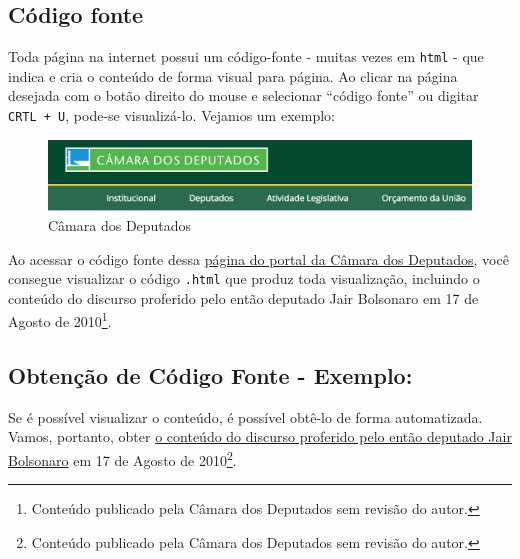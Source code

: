 \documentclass[]{book}
\begin{document}
\hypertarget{cuxf3digo-fonte}{%
\subsection{Código fonte}\label{cuxf3digo-fonte}}

Toda página na internet possui um código-fonte - muitas vezes em \texttt{html} - que indica
e cria o conteúdo de forma visual para página. Ao clicar na página desejada com o
botão direito do mouse e selecionar ``código fonte'' ou digitar \texttt{CRTL\ +\ U}, pode-se
visualizá-lo. Vejamos um exemplo:

\begin{figure}
\centering
\includegraphics[width=7.29167in,height=\textheight]{images/deputados.png}
\caption{Câmara dos Deputados}
\end{figure}

Ao acessar o código fonte dessa \href{https://www.camara.leg.br/internet/SitaqWeb/TextoHTML.asp?etapa=5\&nuSessao=174.4.53.O\&nuQuarto=56\&nuOrador=2\&nuInsercao=0\&dtHorarioQuarto=11:46\&sgFaseSessao=BC\&Data=17/08/2010\&txApelido=JAIR\%20BOLSONARO,\%20PP-RJ\&txFaseSessao=Breves\%20Comunica\%C3\%A7\%C3\%B5es\&txTipoSessao=Extraordin\%C3\%A1ria\%20-\%20CD\&dtHoraQuarto=11:46\&txEtapa=}{página do portal da Câmara dos Deputados}, você consegue visualizar o código \texttt{.html} que produz toda visualização,
incluindo o conteúdo do discurso proferido pelo então deputado Jair Bolsonaro em 17 de Agosto de 2010\footnote{Conteúdo publicado pela Câmara dos Deputados sem revisão do autor.}.

\hypertarget{obtenuxe7uxe3o-de-cuxf3digo-fonte---exemplo}{%
\subsection{Obtenção de Código Fonte - Exemplo:}\label{obtenuxe7uxe3o-de-cuxf3digo-fonte---exemplo}}

Se é possível visualizar o conteúdo, é possível obtê-lo de forma automatizada. Vamos, portanto,
obter \href{https://www.camara.leg.br/internet/SitaqWeb/TextoHTML.asp?etapa=5\&nuSessao=174.4.53.O\&nuQuarto=56\&nuOrador=2\&nuInsercao=0\&dtHorarioQuarto=11:46\&sgFaseSessao=BC\&Data=17/08/2010\&txApelido=JAIR\%20BOLSONARO,\%20PP-RJ\&txFaseSessao=Breves\%20Comunica\%C3\%A7\%C3\%B5es\&txTipoSessao=Extraordin\%C3\%A1ria\%20-\%20CD\&dtHoraQuarto=11:46\&txEtapa=}{o conteúdo do discurso proferido pelo então deputado Jair Bolsonaro} em 17 de Agosto de 2010\footnote{Conteúdo publicado pela Câmara dos Deputados sem revisão do autor.}.
\end{document}
